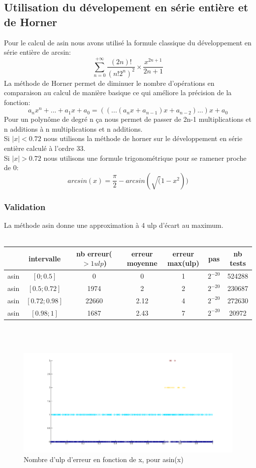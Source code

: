 \documentclass[a4,12pt]{article}
\begin{document}
\subsection{Utilisation du dévelopement en série entière et de Horner}
Pour le calcul de asin nous avons utilisé la formule classique du développement en série entière de arcsin:
$$
    \sum_{n=0}^{+ \infty}\frac{(2n)!}{(n!2^n)^2} \times \frac{x^{2n+1}}{2n+1} 
$$
La méthode de Horner permet de diminuer le nombre d'opérations en comparaison au calcul de manière basique ce qui améliore la précision de la fonction:
$$a_{n}x^n + . . . + a_{1}x + a_0 = ((. . .(a_{n}x + a_{n-1})x + a_{n-2}). . .) x + a_0$$
Pour un polynôme de degré n ça nous permet de passer de 2n-1 multiplications et n additions à n multiplications et n additions.\\
Si $\mid x \mid< 0.72$ nous utilisons la méthode de horner sur le développement en série entière calculé à l'ordre 33.\\
Si $\mid x \mid> 0.72$ nous utilisons une formule trigonométrique pour se ramener proche de 0:
$$
arcsin(x) = \frac{\pi }{2} - arcsin(\sqrt(1-x^2)) 
$$



\subsubsection{Validation}
La méthode asin donne une approximation à 4 ulp d'écart au maximum.\\
\\

\hspace{-3cm}
\begin{tabular}{|c|c|c|c|c|c|c|}
\hline
 & intervalle & nb erreur($>1 ulp$) & erreur moyenne & erreur max(ulp) & pas & nb tests \\
\hline
asin & $[0;0.5]$ & 0 & 0 & 1 &$2^{-20}$ & 524288\\
\hline
asin & $[0.5;0.72]$ & 1974 & 2 & 2 & $2^{-20}$ & 230687\\
\hline
asin & $[0.72;0.98]$ & 22660 & 2.12 & 4 & $2^{-20}$ & 272630\\
\hline
asin & $[0.98;1]$ & 1687 & 2.43 & 7 & $2^{-20}$ & 20972\\
\hline
\end{tabular}\\
\\

\begin{figure}[h!]
    \centering
    \hspace{-5cm}
    \includegraphics[scale=0.5]{asin}
    \caption{Nombre d'ulp d'erreur en fonction de x, pour asin(x)}
    \label{fig:my_label}
\end{figure}
\end{document}

